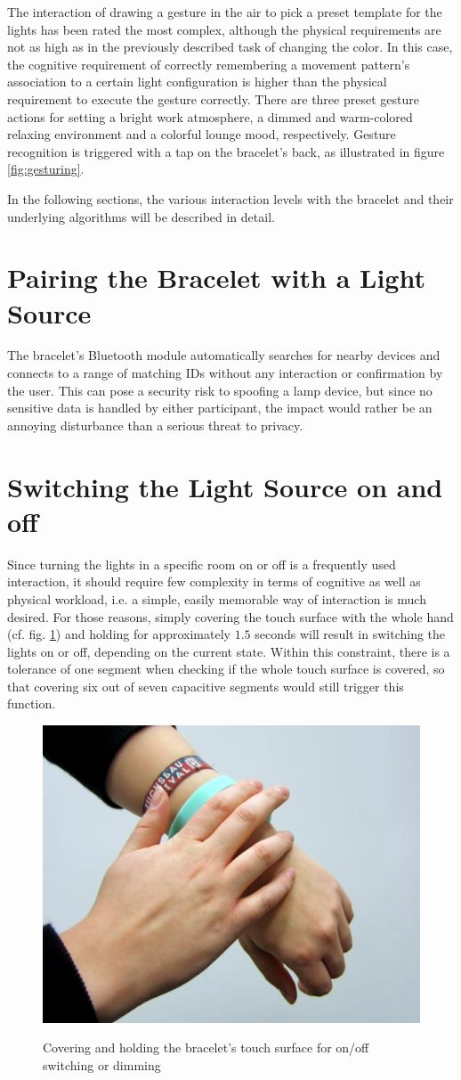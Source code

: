 The interaction of drawing a gesture in the air to pick a preset template for the lights has been rated the most complex, although the physical requirements are not as high as in the previously described task of changing the color. In this case, the cognitive requirement of correctly remembering a movement pattern's association to a certain light configuration is higher than the physical requirement to execute the gesture correctly. There are three preset gesture actions for setting a bright work atmosphere, a dimmed and warm-colored relaxing environment and a colorful lounge mood, respectively. Gesture recognition is triggered with a tap on the bracelet's back, as illustrated in figure \ref{fig:gesturing}.

In the following sections, the various interaction levels with the bracelet and their underlying algorithms will be described in detail.

\section{Pairing the Bracelet with a Light Source}
The bracelet's Bluetooth module automatically searches for nearby devices and connects to a range of matching IDs without any interaction or confirmation by the user. This can pose a security risk to spoofing a lamp device, but since no sensitive data is handled by either participant, the impact would rather be an annoying disturbance than a serious threat to privacy.

\section{Switching the Light Source on and off}
\label{sec:onoff}
Since turning the lights in a specific room on or off is a frequently used interaction, it should require few complexity in terms of cognitive as well as physical workload, i.e. a simple, easily memorable way of interaction is much desired. For those reasons, simply covering the touch surface with the whole hand (cf. fig. \ref{fig:onoff}) and holding for approximately $1.5$ seconds will result in switching the lights on or off, depending on the current state. Within this constraint, there is a tolerance of one segment when checking if the whole touch surface is covered, so that covering six out of seven capacitive segments would still trigger this function.

\begin{figure}[bth]
	\myfloatalign
	{\label{fig:onoff}%
		\includegraphics[width=.45\linewidth]{gfx/cover_touch.png}}
	\caption{Covering and holding the bracelet's touch surface for on/off switching or dimming}
\end{figure}

